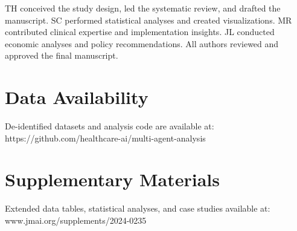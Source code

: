 \documentclass[12pt,letterpaper]{article}
\begin{document}
TH conceived the study design, led the systematic review, and drafted the manuscript. SC performed statistical analyses and created visualizations. MR contributed clinical expertise and implementation insights. JL conducted economic analyses and policy recommendations. All authors reviewed and approved the final manuscript.

\section*{Data Availability}

De-identified datasets and analysis code are available at: https://github.com/healthcare-ai/multi-agent-analysis

\section*{Supplementary Materials}

Extended data tables, statistical analyses, and case studies available at: www.jmai.org/supplements/2024-0235
\end{document}
